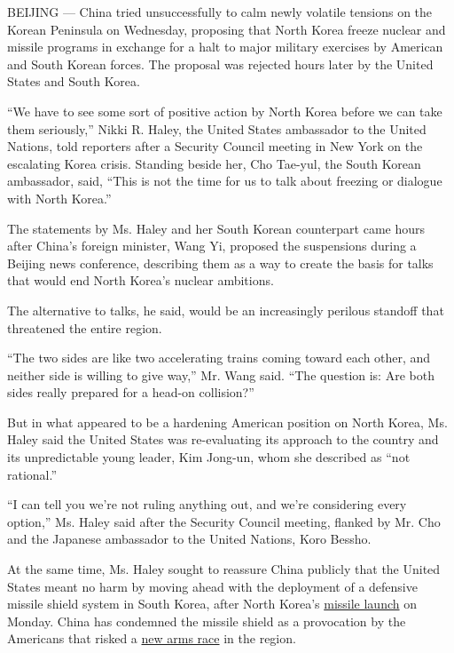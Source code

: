 BEIJING --- China tried unsuccessfully to calm newly volatile tensions
on the Korean Peninsula on Wednesday, proposing that North Korea freeze
nuclear and missile programs in exchange for a halt to major military
exercises by American and South Korean forces. The proposal was rejected
hours later by the United States and South Korea.

``We have to see some sort of positive action by North Korea before we
can take them seriously,'' Nikki R. Haley, the United States ambassador
to the United Nations, told reporters after a Security Council meeting
in New York on the escalating Korea crisis. Standing beside her, Cho
Tae-yul, the South Korean ambassador, said, ``This is not the time for
us to talk about freezing or dialogue with North Korea.''

The statements by Ms. Haley and her South Korean counterpart came hours
after China's foreign minister, Wang Yi, proposed the suspensions during
a Beijing news conference, describing them as a way to create the basis
for talks that would end North Korea's nuclear ambitions.

The alternative to talks, he said, would be an increasingly perilous
standoff that threatened the entire region.

``The two sides are like two accelerating trains coming toward each
other, and neither side is willing to give way,'' Mr. Wang said. ``The
question is: Are both sides really prepared for a head-on collision?''

But in what appeared to be a hardening American position on North Korea,
Ms. Haley said the United States was re-evaluating its approach to the
country and its unpredictable young leader, Kim Jong-un, whom she
described as ``not rational.''

``I can tell you we're not ruling anything out, and we're considering
every option,'' Ms. Haley said after the Security Council meeting,
flanked by Mr. Cho and the Japanese ambassador to the United Nations,
Koro Bessho.

At the same time, Ms. Haley sought to reassure China publicly that the
United States meant no harm by moving ahead with the deployment of a
defensive missile shield system in South Korea, after North Korea's
\href{https://www.nytimes3xbfgragh.onion/2017/03/05/world/north-korea-ballistic-missiles.html?rref=collection\%2Fsectioncollection\%2Fasia\&action=click\&contentCollection=asia\&region=stream\&module=stream_unit\&version=latest\&contentPlacement=16\&pgtype=sectionfront}{missile
launch} on Monday. China has condemned the missile shield as a
provocation by the Americans that risked a
\href{https://www.nytimes3xbfgragh.onion/2017/03/07/world/asia/thaad-missile-defense-us-south-korea-china.html?rref=collection\%2Fsectioncollection\%2Fasia}{new
arms race} in the region.

